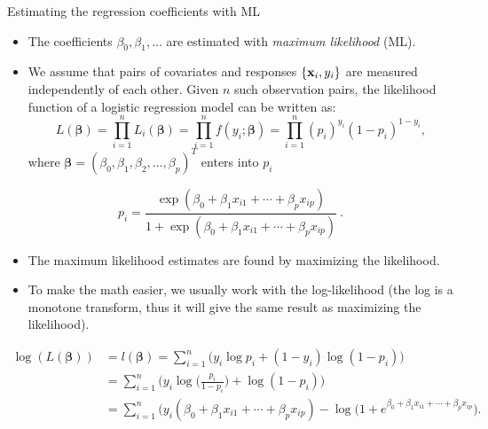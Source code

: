 \documentclass[10pt,ignorenonframetext,]{beamer}
\begin{document}
\begin{frame}

\begin{block}{Estimating the regression coefficients with ML}

\begin{itemize}
\item
  The coefficients \(\beta_0, \beta_1, \ldots\) are estimated with
  \emph{maximum likelihood} (ML).
\item
  We assume that pairs of covariates and responses
  \(\{{\bf x}_i, y_i\}\) are measured independently of each other. Given
  \(n\) such observation pairs, the likelihood function of a logistic
  regression model can be written as:
  \[L(\boldsymbol{\beta}) = \prod_{i=1}^n L_i(\boldsymbol{\beta}) = \prod_{i=1}^n f(y_i; \boldsymbol{\beta}) = \prod_{i=1}^n (p_i)^{y_i}(1-p_i)^{1-y_i},\]
  where
  \(\boldsymbol{\beta} = (\beta_0, \beta_1, \beta_2, \ldots, \beta_p)^T\)
  enters into \(p_i\)
\end{itemize}

\[p_i= \frac{\exp(\beta_0+\beta_1 x_{i1}+\cdots + \beta_p x_{ip})}{1 + \exp(\beta_0 + \beta_1 x_{i1}+\cdots+\beta_p x_{ip})} \ .\]

\end{block}

\end{frame}

\begin{frame}

\begin{itemize}
\item
  The maximum likelihood estimates are found by maximizing the
  likelihood.
\item
  To make the math easier, we usually work with the log-likelihood (the
  log is a monotone transform, thus it will give the same result as
  maximizing the likelihood).
\end{itemize}

\vspace{-4mm}

\begin{align*} \log(L(\boldsymbol{\beta}))&=l(\boldsymbol{\beta}) =\sum_{i=1}^n \Big ( y_i \log p_i + (1-y_i) \log(1 - p_i )\Big ) \\ &= \sum_{i=1}^n \Big ( y_i \log \Big (\frac{p_i}{1-p_i} \Big) + \log(1-p_i) \Big ) \\
&= \sum_{i=1}^n \Big (y_i (\beta_0 + \beta_1 x_{i1}+\cdots + \beta_p x_{ip}) - \log(1 + e^{\beta_0 + \beta_1 x_{i1}+\cdots + \beta_p x_{ip}} \Big ).\end{align*}

\end{frame}
\end{document}
